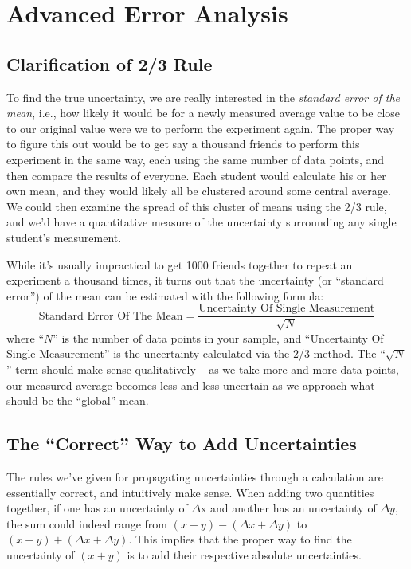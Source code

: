 \documentclass[letterpaper, 12pt]{book}
\newcommand{\myskip}{\vspace{0.5\baselineskip}}
\begin{document}
\chapter{Advanced Error Analysis}
\section{Clarification of 2/3 Rule}

To find the true uncertainty, we are really interested in the \emph{standard error of the mean}, i.e., how likely it would be for a newly measured average value to be close to our original value were we to perform the experiment again.  The proper way to figure this out would be to get say a thousand friends to perform this experiment in the same way, each using the same number of data points, and then compare the results of everyone.  Each student would calculate his or her own mean, and they would likely all be clustered around some central average.  We could then examine the spread of this cluster of means using the 2/3 rule, and we'd have a quantitative measure of the uncertainty surrounding any single student's measurement.\myskip

While it's usually impractical to get 1000 friends together to repeat an experiment a thousand times, it turns out that the uncertainty (or ``standard error'') of the mean can be estimated with the following formula:
\begin{equation}
    \text{Standard Error Of The Mean} = \frac{\text{Uncertainty Of Single Measurement}}{\sqrt{N}}
\end{equation}
where ``$N$'' is the number of data points in your sample, and ``Uncertainty Of Single Measurement'' is the uncertainty calculated via the 2/3 method.  The ``$\sqrt{N}$'' term should make sense qualitatively -- as we take more and more data points, our measured average becomes less and less uncertain as we approach what should be the ``global'' mean.

\section{The ``Correct'' Way to Add Uncertainties}

The rules we've given for propagating uncertainties through a calculation are essentially correct, and intuitively make sense.  When adding two quantities together, if one has an uncertainty of $\Delta$x and another has an uncertainty of $\Delta y$, the sum could indeed range from $(x+y) - (\Delta x +  \Delta y)$ to $(x+y) + (\Delta x + \Delta y)$.  This implies that the proper way to find the uncertainty of $(x+y)$ is to add their respective absolute uncertainties. \myskip
\end{document}
